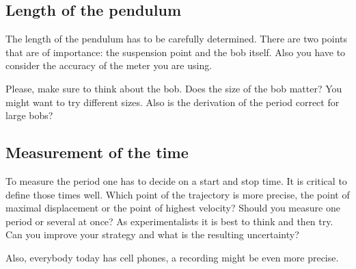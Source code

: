 \documentclass[10pt,aps,twocolumn,secnumarabic,balancelastpage,amsmath,amssymb,nofootinbib,floatfix]{revtex4}
\begin{document}
\subsection{Length of the pendulum}

The length of the pendulum has to be carefully determined. There are two points that are of importance: the suspension point and the bob itself. Also you have to consider the accuracy of the meter you are using.

Please, make sure to think about the bob. Does the size of the bob matter? You might want to try different sizes. Also is the derivation of the period correct for large bobs?

\subsection{Measurement of the time}

To measure the period one has to decide on a start and stop time. It is critical to define those times well. Which point of the trajectory is more precise, the point of maximal displacement or the point of highest velocity? Should you measure one period or several at once? As experimentalists it is best to think and then try. Can you improve your strategy and what is the resulting uncertainty?

Also, everybody today has cell phones, a recording might be even more precise.


\end{document}
